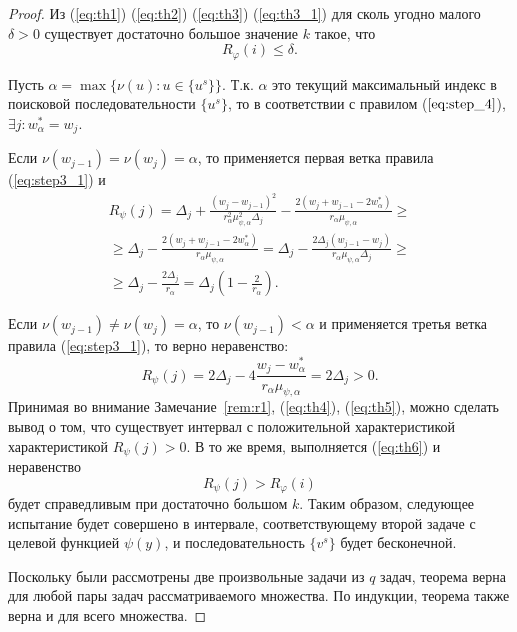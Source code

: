\begin{proof}
  Из (\ref{eq:th1}) (\ref{eq:th2}) (\ref{eq:th3}) (\ref{eq:th3_1}) для сколь угодно малого \(\delta > 0\) существует достаточно большое значение \(k\) такое, что
  \begin{equation}
    R_\varphi(i)\leqslant \delta.
    \label{eq:th6}
  \end{equation}

  Пусть \(\alpha = \max\{\nu(u):u\in\{u^s\}\}\). Т.к. \(\alpha\) это текущий максимальный индекс
  в поисковой последовательности \(\{u^s\}\), то в соответствии с правилом (\(\ref{eq:step_4}\)), \(\exists j: w^*_\alpha=w_j\).

  Если \(\nu(w_{j-1})=\nu(w_{j})=\alpha\), то применяется первая ветка правила (\ref{eq:step3_1}) и
  \begin{equation}
    \begin{array}{l}
      R_\psi(j)=\Delta_j + \frac{(w_j-w_{j-1})^2}{r_\alpha^2\mu_{\psi,\alpha}^2\Delta_j}
        - \frac{2(w_j+w_{j-1}-2w^*_\alpha)}{r_\alpha\mu_{\psi,\alpha}} \geqslant \\
        \geqslant\Delta_j - \frac{2(w_j+w_{j-1}-2w^*_\alpha)}{r_\alpha\mu_{\psi,\alpha}} =
        \Delta_j - \frac{2\Delta_j(w_{j-1}-w_j)}{r_\alpha\mu_{\psi,\alpha}\Delta_j} \geqslant\\
        \geqslant \Delta_j - \frac{2\Delta_j}{r_\alpha} = \Delta_j\left(1-\frac{2}{r_\alpha}\right).
      \end{array}
    \label{eq:th4}
  \end{equation}

  Если \(\nu(w_{j-1})\ne\nu(w_{j})=\alpha\), то \(\nu(w_{j-1})<\alpha\) и применяется третья ветка правила (\ref{eq:step3_1}), то верно неравенство:
  \begin{equation}
    R_\psi(j)=2\Delta_j - 4 \frac{w_j-w^*_{\alpha}}{r_\alpha \mu_{\psi,\alpha}}=2\Delta_j > 0.
    \label{eq:th5}
  \end{equation}
  Принимая во внимание Замечание~\ref{rem:r1}, (\ref{eq:th4}), (\ref{eq:th5}), можно сделать вывод о том, что
  существует интервал с положительной характеристикой характеристикой \(R_\psi(j)>0\). В то же время, выполняется (\ref{eq:th6})
  и неравенство
  \begin{displaymath}
    R_\psi(j) > R_\varphi(i)
  \end{displaymath}
  будет справедливым при достаточно большом \(k\). Таким образом, следующее испытание будет совершено
  в интервале, соответствующему второй задаче с целевой функцией \(\psi(y)\), и последовательность \(\{v^s\}\) будет бесконечной.

  Поскольку были рассмотрены две произвольные задачи из \(q\) задач, теорема верна для любой пары задач рассматриваемого множества.
  По индукции, теорема также верна и для всего множества.
\end{proof}


